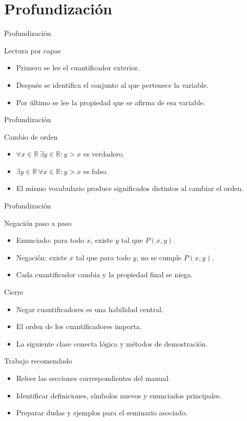 \documentclass[aspectratio=169,11pt]{beamer}
\begin{document}
\section{Profundización}

\begin{frame}{Profundización}
\begin{block}{Lectura por capas}
\begin{itemize}
  \item Primero se lee el cuantificador exterior.
  \item Después se identifica el conjunto al que pertenece la variable.
  \item Por último se lee la propiedad que se afirma de esa variable.
\end{itemize}
\end{block}
\end{frame}

\begin{frame}{Profundización}
\begin{block}{Cambio de orden}
\begin{itemize}
  \item \(\forall x\in\mathbb{R}\,\exists y\in\mathbb{R}: y>x\) es verdadero.
  \item \(\exists y\in\mathbb{R}\,\forall x\in\mathbb{R}: y>x\) es falso.
  \item El mismo vocabulario produce significados distintos al cambiar el orden.
\end{itemize}
\end{block}
\end{frame}

\begin{frame}{Profundización}
\begin{block}{Negación paso a paso}
\begin{itemize}
  \item Enunciado: para todo \(x\), existe \(y\) tal que \(P(x,y)\).
  \item Negación: existe \(x\) tal que para todo \(y\), no se cumple \(P(x,y)\).
  \item Cada cuantificador cambia y la propiedad final se niega.
\end{itemize}
\end{block}
\end{frame}

\begin{frame}{Cierre}
\begin{itemize}
  \item Negar cuantificadores es una habilidad central.
  \item El orden de los cuantificadores importa.
  \item La siguiente clase conecta lógica y métodos de demostración.
\end{itemize}
\end{frame}

\begin{frame}{Trabajo recomendado}
\begin{itemize}
  \item Releer las secciones correspondientes del manual.
  \item Identificar definiciones, símbolos nuevos y enunciados principales.
  \item Preparar dudas y ejemplos para el seminario asociado.
\end{itemize}
\end{frame}
\end{document}
